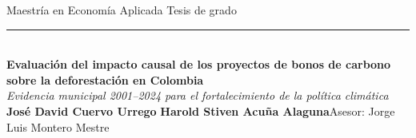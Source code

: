 \documentclass[final,t]{beamer}
\begin{document}
\begin{frame}[t]{}

\begin{tcolorbox}[colback=dosel,colframe=dosel,boxrule=0pt,sharp corners,
  left=1.2cm,right=1.2cm,top=1.0cm,bottom=1.0cm]
  {\color{papel!70}\normalsize Maestría en Economía Aplicada \quad\textbullet\quad Tesis de grado}\\[0.3cm]
  {\color{papel!40}\rule{\linewidth}{1pt}}\\[0.6cm]
  {\color{papel}\fontsize{72}{80}\selectfont\bfseries
   Evaluación del impacto causal de los proyectos de bonos de carbono
   sobre la deforestación en Colombia}\\[0.5cm]
  {\color{papel!75}\fontsize{36}{44}\selectfont\itshape
   Evidencia municipal 2001--2024 para el fortalecimiento de la política climática}\\[0.7cm]
  {\color{papel!85}\large\textbf{José David Cuervo Urrego}\quad\textbullet\quad
   \textbf{Harold Stiven Acuña Alaguna}\qquad Asesor: Jorge Luis Montero Mestre}
\end{tcolorbox}




\end{frame}
\end{document}
